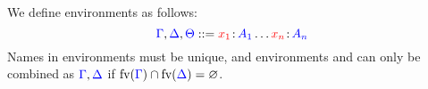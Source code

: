 \begin{definition}[Environments]\label{def:cp-environments}
  We define environments as follows:
  \[
    \textcolor{blue}{\Gamma}, \textcolor{blue}{\Delta}, \textcolor{blue}{\Theta}
    ::= \textcolor{red}{x_1}\colon\!\textcolor{blue}{A_1}\dots\textcolor{red}{x_n}\colon\!\textcolor{blue}{A_n}
  \] 
  Names in environments must be unique, and environments \ty{\Gamma} and
  \ty{\Delta} can only be combined as $\textcolor{blue}{\Gamma}, \textcolor{blue}{\Delta}$ if
  $\text{fv}(\textcolor{blue}{\Gamma}) \cap \text{fv}(\textcolor{blue}{\Delta}) = \varnothing$. 
\end{definition}
